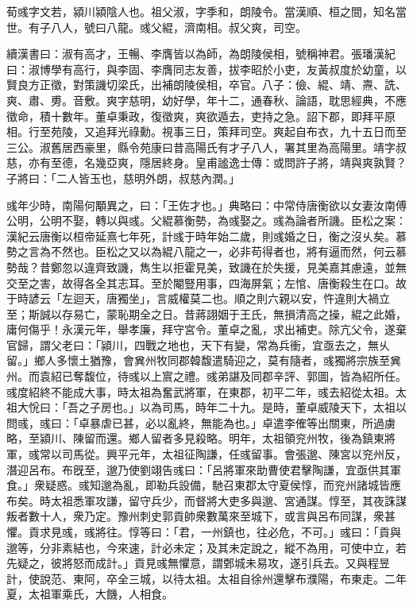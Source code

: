 
\begin{pinyinscope}
荀彧字文若，潁川潁陰人也。祖父淑，字季和，朗陵令。當漢順、桓之間，知名當世。有子八人，號曰八龍。彧父緄，濟南相。叔父爽，司空。

續漢書曰：淑有高才，王暢、李膺皆以為師，為朗陵侯相，號稱神君。張璠漢紀曰：淑博學有高行，與李固、李膺同志友善，拔李昭於小吏，友黃叔度於幼童，以賢良方正徵，對策譏切梁氏，出補朗陵侯相，卒官。八子：儉、緄、靖、燾、詵、爽、肅、旉。音敷。爽字慈明，幼好學，年十二，通春秋、論語，耽思經典，不應徵命，積十數年。董卓秉政，復徵爽，爽欲遁去，吏持之急。詔下郡，即拜平原相。行至苑陵，又追拜光祿勳。視事三日，策拜司空。爽起自布衣，九十五日而至三公。淑舊居西豪里，縣令苑康曰昔高陽氏有才子八人，署其里為高陽里。靖字叔慈，亦有至德，名幾亞爽，隱居終身。皇甫謐逸士傳：或問許子將，靖與爽孰賢？子將曰：「二人皆玉也，慈明外朗，叔慈內潤。」

彧年少時，南陽何顒異之，曰：「王佐才也。」典略曰：中常侍唐衡欲以女妻汝南傅公明，公明不娶，轉以與彧。父緄慕衡勢，為彧娶之。彧為論者所譏。臣松之案：漢紀云唐衡以桓帝延熹七年死，計彧于時年始二歲，則彧婚之日，衡之沒乆矣。慕勢之言為不然也。臣松之又以為緄八龍之一，必非苟得者也，將有逼而然，何云慕勢哉？昔鄭忽以違齊致譏，雋生以拒霍見美，致譏在於失援，見美嘉其慮遠，並無交至之害，故得各全其志耳。至於閹豎用事，四海屏氣；左悺、唐衡殺生在口。故于時諺云「左迴天，唐獨坐」，言威權莫二也。順之則六親以安，忤違則大禍立至；斯誠以存易亡，蒙恥期全之日。昔蔣詡姻于王氏，無損清高之操，緄之此婚，庸何傷乎！永漢元年，舉孝廉，拜守宮令。董卓之亂，求出補吏。除亢父令，遂棄官歸，謂父老曰：「潁川，四戰之地也，天下有變，常為兵衝，宜亟去之，無乆留。」鄉人多懷土猶豫，會兾州牧同郡韓馥遣騎迎之，莫有隨者，彧獨將宗族至兾州。而袁紹已奪馥位，待彧以上賔之禮。彧弟諶及同郡辛評、郭圖，皆為紹所任。彧度紹終不能成大事，時太祖為奮武將軍，在東郡，初平二年，彧去紹從太祖。太祖大恱曰：「吾之子房也。」以為司馬，時年二十九。是時，董卓威陵天下，太祖以問彧，彧曰：「卓暴虐已甚，必以亂終，無能為也。」卓遣李傕等出關東，所過虜略，至潁川、陳留而還。鄉人留者多見殺略。明年，太祖領兖州牧，後為鎮東將軍，彧常以司馬從。興平元年，太祖征陶謙，任彧留事。會張邈、陳宮以兖州反，潛迎呂布。布旣至，邈乃使劉翊告彧曰：「呂將軍來助曹使君擊陶謙，宜亟供其軍食。」衆疑惑。彧知邈為亂，即勒兵設備，馳召東郡太守夏侯惇，而兖州諸城皆應布矣。時太祖悉軍攻謙，留守兵少，而督將大吏多與邈、宮通謀。惇至，其夜誅謀叛者數十人，衆乃定。豫州刺史郭貢帥衆數萬來至城下，或言與呂布同謀，衆甚懼。貢求見彧，彧將往。惇等曰：「君，一州鎮也，往必危，不可。」彧曰：「貢與邈等，分非素結也，今來速，計必未定；及其未定說之，縱不為用，可使中立，若先疑之，彼將怒而成計。」貢見彧無懼意，謂鄄城未易攻，遂引兵去。又與程昱計，使說范、東阿，卒全三城，以待太祖。太祖自徐州還擊布濮陽，布東走。二年夏，太祖軍乘氏，大饑，人相食。


\end{pinyinscope}
